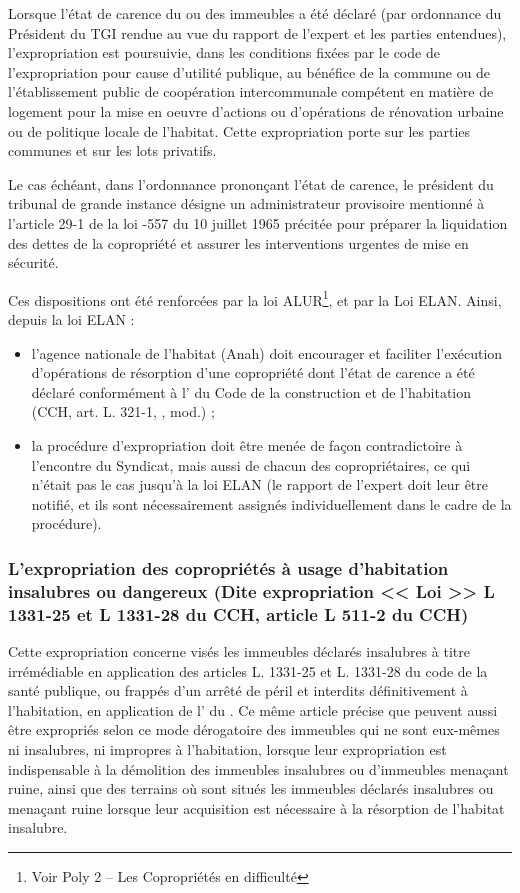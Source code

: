		Lorsque l’état de carence du ou des immeubles a été déclaré (par ordonnance du Président du TGI rendue
		au vue du rapport de l’expert et les parties entendues), l’expropriation est poursuivie, dans les conditions
		fixées par le code de l’expropriation pour cause d’utilité publique, au bénéfice de la commune ou de
		l’établissement public de coopération intercommunale compétent en matière de logement pour la mise
		en oeuvre d’actions ou d’opérations de rénovation urbaine ou de politique locale de l’habitat. Cette
		expropriation porte sur les parties communes et sur les lots privatifs.
		
		Le cas échéant, dans l'ordonnance prononçant l'état de carence, le président du tribunal de grande
		instance désigne un administrateur provisoire mentionné à l'article 29-1 de la loi -557 du 10 juillet
		1965 précitée pour préparer la liquidation des dettes de la copropriété et assurer les interventions
		urgentes de mise en sécurité.

		Ces dispositions ont été renforcées par la loi ALUR\footnote{Voir Poly 2 – Les Copropriétés en difficulté}, et par la Loi ELAN.
		Ainsi, depuis la loi ELAN :
		\begin{itemize}
			\item l’agence nationale de l’habitat (Anah) doit encourager et faciliter l’exécution d’opérations de
			résorption d’une copropriété dont l’état de carence a été déclaré conformément à l’ du Code de la construction et de l’habitation (CCH, art. L. 321-1, \I, mod.) ;
			\item la procédure d’expropriation doit être menée de façon contradictoire à l’encontre du Syndicat,
			mais aussi de chacun des copropriétaires, ce qui n’était pas le cas jusqu’à la loi ELAN (le rapport
			de l’expert doit leur être notifié, et ils sont nécessairement assignés individuellement dans le cadre
			de la procédure).
		\end{itemize}
		
		\subsubsection{L’expropriation des copropriétés à usage d’habitation insalubres ou dangereux (Dite expropriation << Loi  >> L 1331-25 et L 1331-28 du CCH, article L 511-2 du CCH)}
		
		Cette expropriation concerne visés les immeubles déclarés insalubres à titre irrémédiable en
		application des articles L. 1331-25 et L. 1331-28 du code de la santé publique, ou frappés d’un arrêté de
		péril et interdits définitivement à l’habitation, en application de l’ du \CCH. Ce même article
		précise que peuvent aussi être expropriés selon ce mode dérogatoire des immeubles qui ne sont eux-mêmes
		ni insalubres, ni impropres à l'habitation, lorsque leur expropriation est indispensable à la
		démolition des immeubles insalubres ou d'immeubles menaçant ruine, ainsi que des terrains où sont situés
		les immeubles déclarés insalubres ou menaçant ruine lorsque leur acquisition est nécessaire à la
		résorption de l'habitat insalubre.
		
